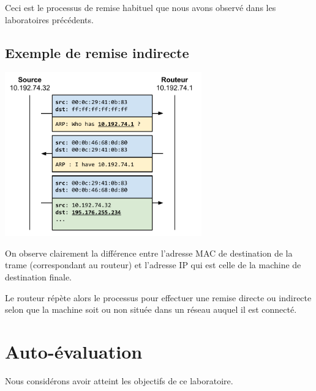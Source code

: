 \documentclass[11pt,a4paper]{article}
\begin{document}
Ceci est le processus de remise habituel que nous avons observé dans les laboratoires précédents.

\subsection{Exemple de remise indirecte}

\begin{center}
\includegraphics[width=8.5cm]{img_indirect}
\end{center}

On observe clairement la différence entre l'adresse MAC de destination de la trame (correspondant au routeur) et l'adresse IP qui est celle de la machine de destination finale.

Le routeur répète alors le processus pour effectuer une remise directe ou indirecte selon que la machine soit ou non située dans un réseau auquel il est connecté.

\section{Auto-évaluation}

Nous considérons avoir atteint les objectifs de ce laboratoire.
\end{document}
